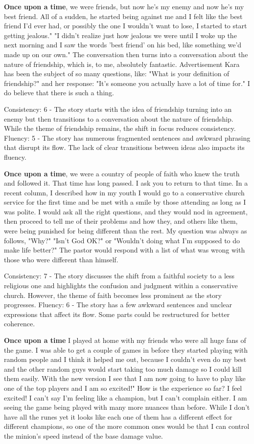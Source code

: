 \documentclass{article}
\begin{document}
\textbf{Once upon a time}, we were friends, but now he's my enemy and now he's my best friend. All of a sudden, he started being against me and I felt like the best friend I'd ever had, or possibly the one I wouldn't want to lose, I started to start getting jealous." "I didn't realize just how jealous we were until I woke up the next morning and I saw the words 'best friend' on his bed, like something we'd made up on our own." The conversation then turns into a conversation about the nature of friendship, which is, to me, absolutely fantastic. Advertisement Kara has been the subject of so many questions, like: "What is your definition of friendship?" and her response: "It's someone you actually have a lot of time for." I do believe that there is such a thing.

Consistency: 6 - The story starts with the idea of friendship turning into an enemy but then transitions to a conversation about the nature of friendship. While the theme of friendship remains, the shift in focus reduces consistency.
Fluency: 5 - The story has numerous fragmented sentences and awkward phrasing that disrupt its flow. The lack of clear transitions between ideas also impacts its fluency.

\textbf{Once upon a time}, we were a country of people of faith who knew the truth and followed it. That time has long passed. I ask you to return to that time. In a recent column, I described how in my youth I would go to a conservative church service for the first time and be met with a smile by those attending as long as I was polite. I would ask all the right questions, and they would nod in agreement, then proceed to tell me of their problems and how they, and others like them, were being punished for being different than the rest. My question was always as follows, "Why?" "Isn't God OK?" or "Wouldn't doing what I'm supposed to do make life better?" The pastor would respond with a list of what was wrong with those who were different than himself.

Consistency: 7 - The story discusses the shift from a faithful society to a less religious one and highlights the confusion and judgment within a conservative church. However, the theme of faith becomes less prominent as the story progresses.
Fluency: 6 - The story has a few awkward sentences and unclear expressions that affect its flow. Some parts could be restructured for better coherence.

\textbf{Once upon a time} I played at home with my friends who were all huge fans of the game. I was able to get a couple of games in before they started playing with random people and I think it helped me out, because I couldn't even do my best and the other random guys would start taking too much damage so I could kill them easily. With the new version I see that I am now going to have to play like one of the top players and I am so excited!" How is the experience so far? I feel excited! I can't say I'm feeling like a champion, but I can't complain either. I am seeing the game being played with many more nuances than before. While I don't have all the runes yet it looks like each one of them has a different effect for different champions, so one of the more common ones would be that I can control the minion's speed instead of the base damage value.
\end{document}
